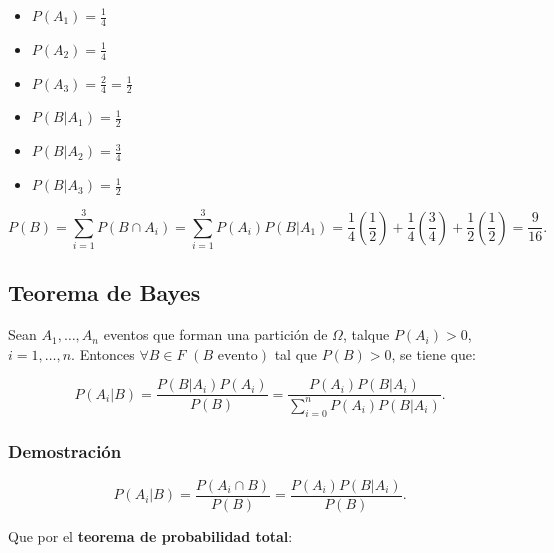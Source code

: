 \documentclass[a4paper]{book}
\begin{document}
\begin{enumerate}[{Ej.1) }]
        \begin{itemize}
            \item \(P\left(A_1\right)=\frac{1}{4}\)
            \item \(P\left(A_2\right)=\frac{1}{4}\)
            \item \(P\left(A_3\right)=\frac{2}{4}=\frac{1}{2}\)
        \end{itemize}

        \begin{itemize}
            \item \(P\left(B|A_1\right)=\frac{1}{2}\)
            \item \(P\left(B|A_2\right)=\frac{3}{4}\)
            \item \(P\left(B|A_3\right)=\frac{1}{2}\)
        \end{itemize}

        \[
            P\left(B\right) = \sum_{i=1}^{3} P\left(B\cap A_{i}\right) = \sum_{i=1}^{3} P\left(A_{i}\right)P\left(B|A_{1}\right) = \frac{1}{4}\left(\frac{1}{2}\right)+\frac{1}{4}\left(\frac{3}{4}\right)+\frac{1}{2}\left( \frac{1}{2} \right)=\frac{9}{16}
        .\]

\end{enumerate}

\subsection{Teorema de Bayes}
\label{ssec:teorema_de_bayes}

Sean \(A_1,\ldots,A_{n}\) eventos que forman una partición de \(\Omega \), talque \(P\left(A_{i}\right)>0\), \(i=1,\ldots,n\). Entonces \(\forall B\in F\) \(\left(B\text{ evento}\right) \) tal que \(P\left(B\right)>0\), se tiene que:

\[
P\left(A_{i}|B\right)=\frac{P\left(B|A_{i}\right)P\left(A_{i}\right)}{P\left(B\right)} = \frac{P\left(A_{i}\right)P\left(B|A_{i}\right)}{\sum_{i=0}^{n} P\left(A_{i}\right)P\left(B|A_{i}\right)}
.\]

\subsubsection{Demostración}

\[
    P\left(A_{i}|B\right) = \frac{P\left(A_{i}\cap B\right)}{P\left(B\right)} = \frac{P\left(A_{i}\right)P\left(B|A_{i}\right)}{P\left(B\right)}
.\]

Que por el \textbf{teorema de probabilidad total}:
\end{document}
